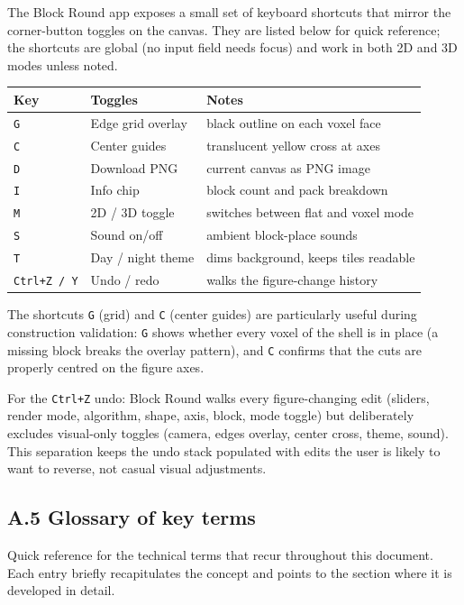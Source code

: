 \documentclass[12pt,a4paper]{scrartcl}
\newcommand{\code}[1]{\texttt{\small #1}}
\begin{document}
The Block Round app exposes a small set of keyboard shortcuts that mirror the corner-button toggles on the canvas. They are listed below for quick reference; the shortcuts are global (no input field needs focus) and work in both 2D and 3D modes unless noted.

\vspace{0.4em}
\begin{center}
\begin{tabular}{@{}lll@{}}
\toprule
\textbf{Key} & \textbf{Toggles} & \textbf{Notes} \\
\midrule
\code{G} & Edge grid overlay  & black outline on each voxel face \\
\code{C} & Center guides  & translucent yellow cross at axes \\
\code{D} & Download PNG  & current canvas as PNG image \\
\code{I} & Info chip  & block count and pack breakdown \\
\code{M} & 2D / 3D toggle  & switches between flat and voxel mode \\
\code{S} & Sound on/off  & ambient block-place sounds \\
\code{T} & Day / night theme  & dims background, keeps tiles readable \\
\code{Ctrl+Z / Y} & Undo / redo  & walks the figure-change history \\
\bottomrule
\end{tabular}
\end{center}

The shortcuts \code{G} (grid) and \code{C} (center guides) are particularly useful during construction validation: \code{G} shows whether every voxel of the shell is in place (a missing block breaks the overlay pattern), and \code{C} confirms that the cuts are properly centred on the figure axes.

For the \code{Ctrl+Z} undo: Block Round walks every figure-changing edit (sliders, render mode, algorithm, shape, axis, block, mode toggle) but deliberately excludes visual-only toggles (camera, edges overlay, center cross, theme, sound). This separation keeps the undo stack populated with edits the user is likely to want to reverse, not casual visual adjustments.

\subsection*{A.5 Glossary of key terms}

Quick reference for the technical terms that recur throughout this document. Each entry briefly recapitulates the concept and points to the section where it is developed in detail.
\end{document}
